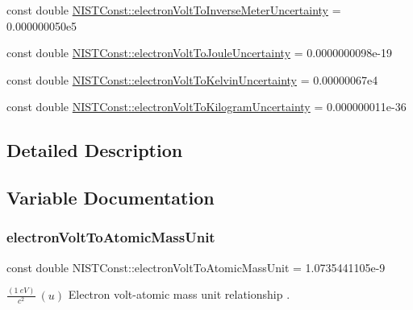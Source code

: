 \begin{DoxyCompactItemize}
const double \hyperlink{group___electron_volt_gab410911d31f242cb940fe960d19b1ddb}{N\+I\+S\+T\+Const\+::electron\+Volt\+To\+Inverse\+Meter\+Uncertainty} = 0.\+000000050e5
\item 
const double \hyperlink{group___electron_volt_ga32594652a8bac45e8676551612471385}{N\+I\+S\+T\+Const\+::electron\+Volt\+To\+Joule\+Uncertainty} = 0.\+0000000098e-\/19
\item 
const double \hyperlink{group___electron_volt_ga6754c9f090abf4bff80621978bf85eb1}{N\+I\+S\+T\+Const\+::electron\+Volt\+To\+Kelvin\+Uncertainty} = 0.\+00000067e4
\item 
const double \hyperlink{group___electron_volt_ga77aec1f5b68dd74739fe268fa4362a85}{N\+I\+S\+T\+Const\+::electron\+Volt\+To\+Kilogram\+Uncertainty} = 0.\+000000011e-\/36
\end{DoxyCompactItemize}


\subsection{Detailed Description}


\subsection{Variable Documentation}
\mbox{\label{group___electron_volt_gabd56c1195e7ce2bb9c314e88b43e30ab}} 
\subsubsection{\texorpdfstring{electron\+Volt\+To\+Atomic\+Mass\+Unit}{electronVoltToAtomicMassUnit}}
{\footnotesize\ttfamily const double N\+I\+S\+T\+Const\+::electron\+Volt\+To\+Atomic\+Mass\+Unit = 1.\+0735441105e-\/9}

$\frac{(1\ eV)}{c^2}\ (u)$ Electron volt-\/atomic mass unit relationship . \mbox{\label{group___electron_volt_ga0f93985ef9b7a71e0c1e6172d6d041a5}} 
